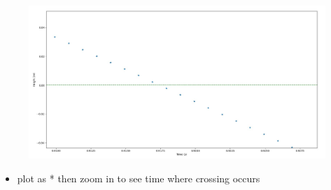 \documentclass[english,14pt]{beamer}
\begin{document}

\begin{frame}[fragile]

\frametitle{}

\begin{figure}[ht]
	\centering
	\includegraphics[width=\textwidth]{figures/LLp66ZoomOutput}
\end{figure}

\begin{itemize}
	\item plot as * then zoom in to see time where crossing occurs
\end{itemize}

\end{frame}

\end{document}
